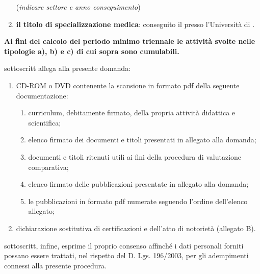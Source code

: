 \documentclass[a4paper,10pt]{article}
\begin{document}
\begin{Form}
\begin{enumerate}
(\emph{indicare settore e anno conseguimento}) \myTextField{}
\item \textbf{il titolo di specializzazione medica}: conseguito il \myTextField{} 
presso l’Università di  \myTextField{}.
\end{enumerate}
\textbf{Ai fini del calcolo del periodo minimo triennale le attività svolte 
nelle tipologie a), b) e c) di cui sopra sono cumulabili.}

\myTextField[.5cm]{} sottoscritt\myTextField[.5cm]{} allega alla presente 
domanda:
\begin{enumerate}
\item CD-ROM o DVD contenente la scansione in formato pdf della seguente 
documentazione:
\begin{enumerate}[label=\emph{\roman*})]
\item curriculum, debitamente firmato, della propria attività didattica e scientifica;
\item elenco firmato dei documenti e titoli presentati in allegato alla domanda;
\item documenti e titoli ritenuti utili ai fini della procedura di valutazione 
comparativa;
\item elenco firmato delle pubblicazioni presentate in allegato alla domanda;
\item le pubblicazioni in formato pdf numerate seguendo l’ordine dell’elenco 
allegato;
\end{enumerate}
\item 	dichiarazione sostitutiva di certificazioni e dell’atto di notorietà 
(allegato B).
\end{enumerate}
\myTextField[.5cm]{} sottoscritt\myTextField[.5cm]{}, infine, esprime il proprio 
consenso affinché i dati personali forniti possano essere trattati, nel rispetto 
del D. Lgs. 196/2003, per gli adempimenti connessi alla presente procedura.

\vspace{\fill}
\end{Form}
\end{document}
